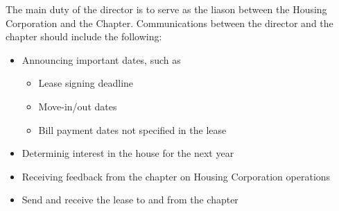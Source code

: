 The main duty of the director is to serve as the liason between the Housing Corporation and the Chapter.
Communications between the director and the chapter should include the following:
\begin{itemize}
        \item Announcing important dates, such as
                \begin{itemize}
                        \item Lease signing deadline
                        \item Move-in/out dates
                        \item Bill payment dates not specified in the lease
                \end{itemize}
        \item Determinig interest in the house for the next year
        \item Receiving feedback from the chapter on Housing Corporation operations
        \item Send and receive the lease to and from the chapter
\end{itemize}
